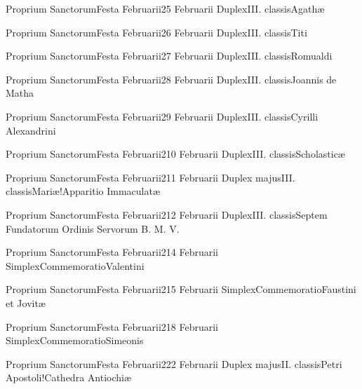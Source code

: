 \documentclass[invitatoriale-romanum.tex]{subfiles}
\begin{document}
	{Proprium Sanctorum}{Festa Februarii}{2}{5 Februarii}
	{Duplex}{III. classis}{Agathæ}
	{}
	{}

	{Proprium Sanctorum}{Festa Februarii}{2}{6 Februarii}
	{Duplex}{III. classis}{Titi}
	{}
	{}

	{Proprium Sanctorum}{Festa Februarii}{2}{7 Februarii}
	{Duplex}{III. classis}{Romualdi}
	{}
	{}

	{Proprium Sanctorum}{Festa Februarii}{2}{8 Februarii}
	{Duplex}{III. classis}{Joannis de Matha}
	{}
	{}

	{Proprium Sanctorum}{Festa Februarii}{2}{9 Februarii}
	{Duplex}{III. classis}{Cyrilli Alexandrini}
	{}
	{}

	{Proprium Sanctorum}{Festa Februarii}{2}{10 Februarii}
	{Duplex}{III. classis}{Scholasticæ}
	{}
	{}

	{Proprium Sanctorum}{Festa Februarii}{2}{11 Februarii}
	{Duplex majus}{III. classis}{Mariæ!Apparitio Immaculatæ}
	{}
	{}

	{Proprium Sanctorum}{Festa Februarii}{2}{12 Februarii}
	{Duplex}{III. classis}{Septem Fundatorum Ordinis Servorum B. M. V.}
	{}
	{}

	{Proprium Sanctorum}{Festa Februarii}{2}{14 Februarii}
	{Simplex}{Commemoratio}{Valentini}
	{}
	{\invitferia}

	{Proprium Sanctorum}{Festa Februarii}{2}{15 Februarii}
	{Simplex}{Commemoratio}{Faustini et Jovitæ}
	{}
	{\invitferia}

	{Proprium Sanctorum}{Festa Februarii}{2}{18 Februarii}
	{Simplex}{Commemoratio}{Simeonis}
	{}
	{\invitferia}

\newpage

	{Proprium Sanctorum}{Festa Februarii}{2}{22 Februarii}
	{Duplex majus}{II. classis}{Petri Apostoli!Cathedra Antiochiæ}
	{}
	{}
\end{document}
